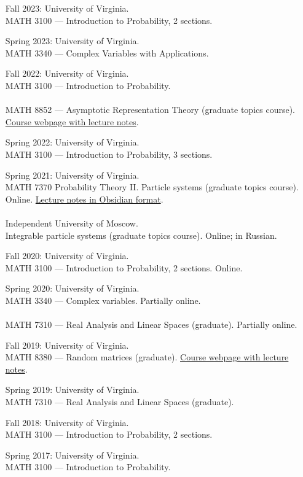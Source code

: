 \documentclass[letterpaper,11pt]{article}
\begin{document}
\begin{itemize}
	\item[Fall 2023:]
	University of Virginia. 
	\\ MATH 3100 --- Introduction to
	Probability, 2 sections.

	\item[Spring 2023:]
	University of Virginia. \\ MATH 3340 --- Complex Variables with Applications.
	
	\item[Fall 2022:]
	University of Virginia. 
	\\ MATH 3100 --- Introduction to
	Probability.
	\\\\
	MATH 8852 --- Asymptotic Representation Theory (graduate topics course).
	\href{https://lpetrov.cc/art2022/}{Course webpage with lecture notes}.

	\item[Spring 2022:]
	University of Virginia. \\ MATH 3100 --- Introduction to
	Probability, 3 sections.
	\item 
	[Spring 2021:]
	University of Virginia.
	\\
	MATH 7370 Probability Theory II. Particle systems (graduate topics course). Online.
	\href{https://github.com/lenis2000/HTML_ParticleSysS21}{Lecture notes in Obsidian format}.
	\\\\
	Independent University of Moscow.
	\\
	Integrable particle systems (graduate topics course). Online; in Russian.
	
\item[Fall 2020:]
	University of Virginia. \\ MATH 3100 --- Introduction to
	Probability, 2 sections. Online.
	\item 
				[Spring 2020:]
				University of Virginia. 
				\\ 
				MATH 3340 --- Complex variables. Partially online.
				\\\\
				MATH 7310 --- Real Analysis and Linear Spaces (graduate). Partially online.
	\item 
				[Fall 2019:]
				University of Virginia. \\ MATH 8380 --- Random matrices (graduate).
				\href{https://lpetrov.cc/rmt19/}{Course webpage with lecture notes}.
	\item 
				[Spring 2019:]
				University of Virginia. \\ MATH 7310 --- Real Analysis and Linear Spaces (graduate).
	\item
	      [Fall 2018:]
	      University of Virginia. \\ MATH 3100 --- Introduction to
				Probability, 2 sections.
	\item
	      [Spring 2017:]
	      University of Virginia. \\ MATH 3100 --- Introduction to
	      Probability.


\end{itemize}
\end{document}
